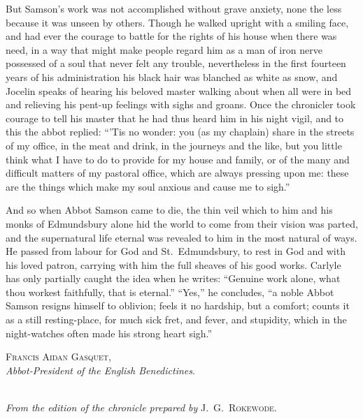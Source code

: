 \documentclass[10pt]{book}
\begin{document}
{{{But Samson's work was not accomplished without grave anxiety, none the less because it was unseen by others. Though he walked upright with a smiling face, and had ever the courage to battle for the rights of his house when there was need, in a way that might make people regard him as a man of iron nerve possessed of a soul that never felt any trouble, nevertheless in the first fourteen years of his administration his black hair was blanched as white as snow, and Jocelin speaks of hearing his beloved master walking about when all were in bed and relieving his pent-up feelings with sighs and groans. Once the chronicler took courage to tell his master that he had thus heard him in his night vigil, and to this the abbot replied: ``'Tis no wonder: you (as my chaplain) share in the streets of my office, in the meat and drink, in the journeys and the like, but you little think what I have to do to provide for my house and family, or of the many and difficult matters of my pastoral office, which are always pressing upon me: these are the things which make my soul anxious and cause me to sigh.''

And so when Abbot Samson came to die, the thin veil which to him and his monks of Edmundsbury alone hid the world to come from their vision was parted, and the supernatural life eternal was revealed to him in the most natural of ways. He passed from labour for God and St.\ Edmundsbury, to rest in God and with his loved patron, carrying with him the full sheaves of his good works. Carlyle has only partially caught the idea when he writes: ``Genuine work alone, what thou workest faithfully, that is eternal.'' ``Yes,'' he concludes, ``a noble Abbot Samson resigns himself to oblivion; feels it no hardship, but a comfort; counts it as a still resting-place, for much sick fret, and fever, and stupidity, which in the night-watches often made his strong heart sigh.''
}
}
}


\begin{flushright}
\parbox{6cm}{
\begin{center}
\textsc{Francis Aidan Gasquet},\\
\vspace{0.1cm}
\emph{Abbot-President of the English Benedictines}.
\end{center}
}
\end{flushright}


\cleardoublepage


\begin{center}
{\fontsize{13}{13} \selectfont
{}\\}
\vspace{.2cm}
\emph{From the edition of the chronicle prepared by} \textsc{J.\ G.\ Rokewode.}
\end{center}
\end{document}
